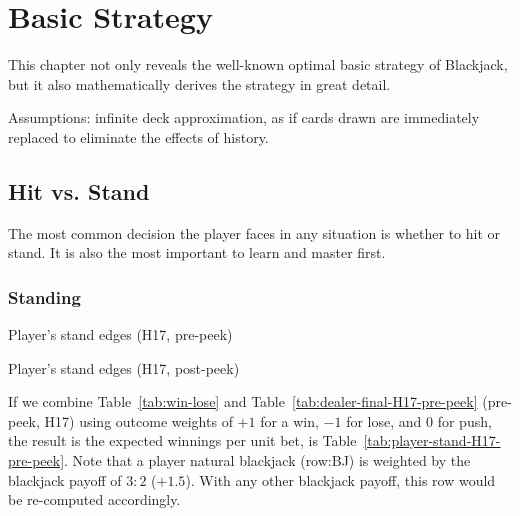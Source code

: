 
\chapter{Basic Strategy}
\label{sec:basic}

This chapter not only reveals the well-known optimal basic strategy
of Blackjack, but it also mathematically derives the strategy 
in great detail.

Assumptions: infinite deck approximation, as if cards drawn are
immediately replaced to eliminate the effects of history.

\section{Hit vs. Stand}
\label{sec:basic:hit-stand}

The most common decision the player faces in any situation
is whether to hit or stand.
It is also the most important to learn and master first.

\subsection{Standing}
\label{sec:basic:hit-stand:stand}

\begin{table}[ht!]
\caption{Player's stand edges (H17, pre-peek)}
\begin{center}

\end{center}
\label{tab:player-stand-H17-pre-peek}
\end{table}

\begin{table}[ht!]
\caption{Player's stand edges (H17, post-peek)}
\begin{center}

\end{center}
\label{tab:player-stand-H17-post-peek}
\end{table}

If we combine Table~\ref{tab:win-lose} and
Table~\ref{tab:dealer-final-H17-pre-peek} (pre-peek, H17) 
using outcome weights of $+1$ for a win, $-1$ for lose, and $0$ for push, 
the result is the expected winnings per unit bet, 
is Table~\ref{tab:player-stand-H17-pre-peek}.
Note that a player natural blackjack (row:BJ) is weighted by the 
blackjack payoff of $3:2$ ($+1.5$).
With any other blackjack payoff, this row would be re-computed accordingly.

